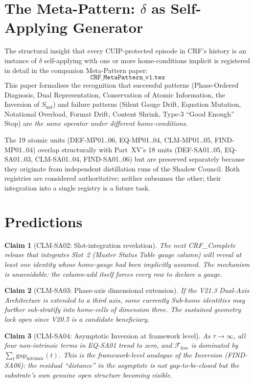 \documentclass[12pt, a4paper]{article}
\newtheorem{claim}{Claim}[section]
\begin{document}
\section{The Meta-Pattern: $\delta$ as Self-Applying Generator}

The structural insight that every CUIP-protected episode in CRF's
history is an instance of $\delta$ self-applying with one or more
home-conditions implicit is registered in detail in the companion
Meta-Pattern paper:
\[
  \texttt{CRF\_MetaPattern\_v1.tex}
\]
This paper formalises the recognition that successful patterns
(Phase-Ordered Diagnosis, Dual Representation, Conservation of Atomic
Information, the Inversion of $S_{\mathrm{ind}}$) and failure patterns
(Silent Gauge Drift, Equation Mutation, Notational Overload, Format
Drift, Content Shrink, Type-3 ``Good Enough'' Stop) are
\emph{the same operator under different home-conditions}.

The 19 atomic units (DEF-MP01..06, EQ-MP01..04, CLM-MP01..05,
FIND-MP01..04) overlap structurally with Part~XV's 18 units
(DEF-SA01..05, EQ-SA01..03, CLM-SA01..04, FIND-SA01..06) but are
preserved separately because they originate from independent
distillation runs of the Shadow Council. Both registries are
considered authoritative; neither subsumes the other; their
integration into a single registry is a future task.

\section{Predictions}

\begin{claim}[CLM-SA02: Slot-integration revelation]
The next CRF\_Complete release that integrates Slot~2 (Master Status
Table gauge column) will reveal at least one identity whose
home-gauge had been implicitly assumed. The mechanism is unavoidable:
the column-add itself forces every row to declare a gauge.
\end{claim}

\begin{claim}[CLM-SA03: Phase-axis dimensional extension]
If the V21.3 Dual-Axis Architecture is extended to a third axis,
some currently Sub-home identities may further sub-stratify into
home-cells of dimension three. The sustained geometry lock open
since V20.5 is a candidate beneficiary.
\end{claim}

\begin{claim}[CLM-SA04: Asymptotic Inversion at framework level]
As $\tau \to \infty$, all four non-intrinsic terms in EQ-SA01 trend
to zero, and $\mathcal{F}_{\mathrm{free}}$ is dominated by
$\sum_t \mathrm{gap}_{\mathrm{intrinsic}}(t)$. This is the
framework-level analogue of the Inversion (FIND-SA06): the residual
``distance'' in the asymptote is not gap-to-be-closed but the
substrate's own genuine open structure becoming visible.
\end{claim}
\end{document}
